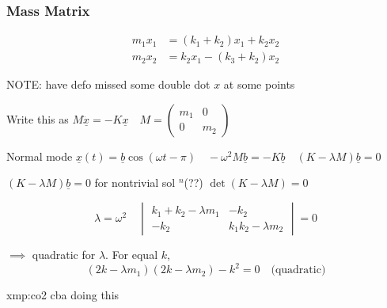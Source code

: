 \documentclass{article}
\begin{document}
\subsubsection{Mass Matrix}
\begin{align*}
    m_{1}x_{1} &= (k_{1} + k_{2}) x_{1} + k_{2}x_{2}\\
    m_{2}x_{2} &= k_{2}x_{1} - (k_{3} + k_{2})x_{2}
\end{align*}

NOTE: have defo missed some double dot $x$ at some points

Write this as $M\underline{\ddot{x}} = -K\underline{x} \quad M = \begin{pmatrix}
    m_{1} & 0 \\
    0 & m_{2}
\end{pmatrix}$

Normal mode $\underline{x}(t) = \underline{b}\cos(\omega t - \pi) \quad -\omega^{2} M \underline{b} = -K \underline{b} \quad (K - \lambda M)\underline{ b} = 0$

$(K - \lambda M) \underline{b} = 0$ for nontrivial sol $^{n}$(??) $\det(K - \lambda M) = 0$

\[ \lambda = \omega^{2} \quad \begin{vmatrix}
    k_{1} + k_{2} - \lambda m_{1} & -k_{2} \\
    -k_{2} & k_{1} k_{2} - \lambda m_{2}
\end{vmatrix} = 0\]

$\implies$ quadratic for $\lambda$. For equal $k$,
\[(2k - \lambda m_{1})(2k - \lambda m_{2}) - k^{2} = 0 \quad \text{(quadratic)}\]



\begin{xmp}[CO2 Molecule]{xmp:co2}{}
    cba doing this
\end{xmp}
\end{document}
